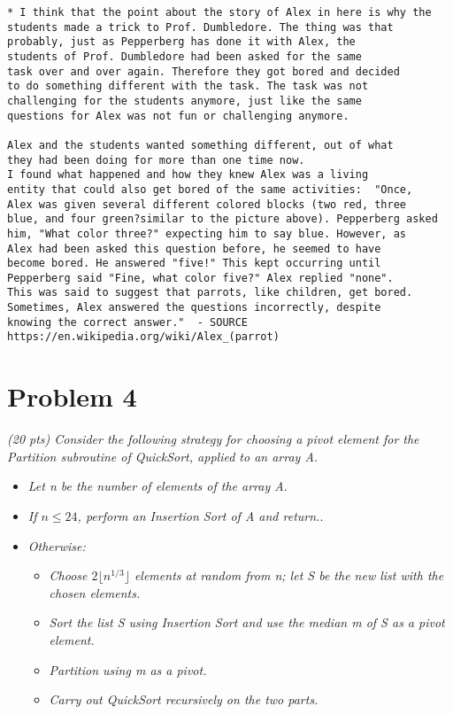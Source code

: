 \documentclass[11pt]{article} \setlength{\oddsidemargin}{0in}
\begin{document}
{\begin{enumerate}
\begin{verbatim}
* I think that the point about the story of Alex in here is why the 
students made a trick to Prof. Dumbledore. The thing was that 
probably, just as Pepperberg has done it with Alex, the 
students of Prof. Dumbledore had been asked for the same 
task over and over again. Therefore they got bored and decided 
to do something different with the task. The task was not 
challenging for the students anymore, just like the same 
questions for Alex was not fun or challenging anymore. 

Alex and the students wanted something different, out of what 
they had been doing for more than one time now. 
I found what happened and how they knew Alex was a living 
entity that could also get bored of the same activities:  "Once, 
Alex was given several different colored blocks (two red, three 
blue, and four green?similar to the picture above). Pepperberg asked 
him, "What color three?" expecting him to say blue. However, as 
Alex had been asked this question before, he seemed to have 
become bored. He answered "five!" This kept occurring until 
Pepperberg said "Fine, what color five?" Alex replied "none". 
This was said to suggest that parrots, like children, get bored. 
Sometimes, Alex answered the questions incorrectly, despite 
knowing the correct answer."  - SOURCE 
https://en.wikipedia.org/wiki/Alex_(parrot) 
   \end{verbatim}

  \end{enumerate}

  \newpage
  \section*{Problem 4}

  \textit{(20 pts) Consider the following strategy for choosing a pivot
    element for the Partition subroutine of QuickSort, applied to an
    array A.}

  \begin{itemize}
  \item \textit{Let n be the number of elements of the array A}.
  \item \textit{If $n \le 24$, perform an Insertion Sort of A and
      return.}.
  \item \textit{Otherwise:}
    \begin{itemize}
    \item \textit{Choose $ 2 \lfloor n^{1/3} \rfloor $ elements at random from n;
        let S be the new list with the chosen elements.}
    \item \textit{Sort the list S using Insertion Sort and use the
        median m of S as a pivot element.}
    \item \textit{Partition using m as a pivot.}
    \item \textit{Carry out QuickSort recursively on the two parts.}
    \end{itemize}
  \end{itemize}

}
\end{document}
